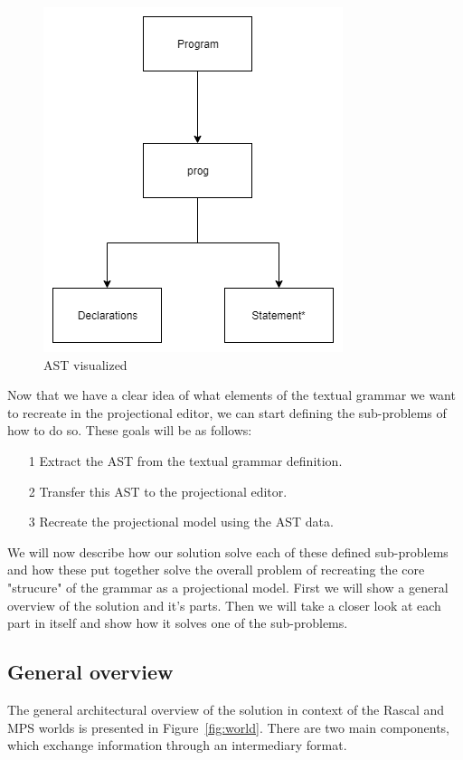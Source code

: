 \documentclass[a4paper, 11pt]{article}
\begin{document}
\begin{figure}[h]
	\centering
	\includegraphics[scale=0.5]{images/AST.png}
	\caption{AST visualized}
	\label{fig:startSyntaxAST}
\end{figure}

Now that we have a clear idea of what elements of the textual grammar we want to recreate in the projectional editor, we can start defining the sub-problems of how to do so. These goals will be as follows:

\begin{itemize}
	\item[1] Extract the AST from the textual grammar definition.
	\item[2] Transfer this AST to the projectional editor.
	\item[3] Recreate the projectional model using the AST data.
\end{itemize}

We will now describe how our solution solve each of these defined sub-problems and how these put together solve the overall problem of recreating the core "strucure" of the grammar as a projectional model. First we will show a general overview of the solution and it's parts. Then we will take a closer look at each part in itself and show how it solves one of the sub-problems. 

\subsection{General overview}

The general architectural overview of the solution in context of the Rascal and MPS worlds is presented in Figure~\ref{fig:world}. There are two main components, which exchange information through an intermediary format. 
\end{document}
